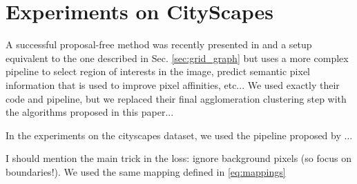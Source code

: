 \section{Experiments on CityScapes}\label{sec:cityscapes_exp}
A successful proposal-free method was recently presented in \cite{liu2018affinity} and a setup equivalent to the one described in Sec. \ref{sec:grid_graph} but uses a more complex pipeline to select region of interests in the image, predict semantic pixel information that is used to improve pixel affinities, etc... We used exactly their code and pipeline, but we replaced their final agglomeration clustering step with the algorithms proposed in this paper...

In the experiments on the cityscapes dataset, we used the pipeline proposed by \cite{liu2018affinity} ...

I should mention the main trick in the loss: ignore background pixels (so focus on boundaries!). We used the same mapping defined in \ref{eq:mappings}




